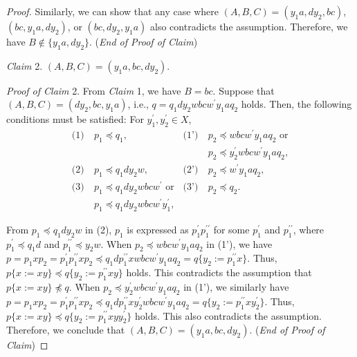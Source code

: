 \begin{proof}
  Similarly, we can show that any case where $(A, B, C) = (y_{1}a, dy_{2}, bc)$, $(bc, y_{1}a, dy_{2})$, or $(bc, dy_{2}, y_{1}a)$ also contradicts the assumption.
  Therefore, we have $B \not\in \{y_{1}a, dy_{2}\}$. (\textit{End of Proof of Claim})

  \smallskip

  \noindent
  \textit{Claim} 2. $(A, B, C) = (y_{1}a, bc, dy_{2})$.

  \smallskip
  \noindent
  \textit{Proof of Claim} 2.
  From \textit{Claim} 1, we have $B=bc$. Suppose that $(A, B, C) = (dy_{2}, bc, y_{1}a)$, i.e., $q = q_{1}dy_{2}wbcw^{\prime}y_{1}aq_{2} $ holds.
  Then, the following conditions must be satisfied: For $y_{1}^{\prime},y_{2}^{\prime}\in X$,
  \begin{align*}
  \textrm{(1)}~& p_{1} \preceq q_{1}, & \textrm{(1')}~& p_{2} \preceq wbcw^{\prime}y_{1}aq_{2}\mbox{ or}\\
  & & & p_{2} \preceq y_{2}^{\prime}wbcw^{\prime}y_{1}aq_{2},\\
  \textrm{(2)}~& p_{1} \preceq q_{1}dy_{2}w, & \textrm{(2')}~& p_{2} \preceq w^{\prime}y_{1}aq_{2}, \\
  \textrm{(3)}~& p_{1} \preceq q_{1}dy_{2}wbcw^{\prime}\mbox{ or} & \textrm{(3')}~& p_{2} \preceq q_{2}.\\
  & p_{1} \preceq q_{1}dy_{2}wbcw^{\prime}y_{1}^{\prime},& &
  \end{align*}
 
  From $p_{1} \preceq q_{1}dy_{2}w$ in (2), $p_{1}$ is expressed as $p^{\prime}_{1}p^{\prime\prime}_{1}$ for some $p^{\prime}_{1}$ and $p^{\prime\prime}_{1}$, where $p^{\prime}_{1} \preceq q_{1}d$ and $p^{\prime\prime}_{1} \preceq y_{2}w$. 
  When $p_{2} \preceq wbcw^{\prime}y_{1}aq_{2}$ in (1'), we have $p=p_{1}xp_{2}=p^{\prime}_{1}p^{\prime\prime}_{1}xp_{2} \preceq q_{1}dp^{\prime\prime}_{1}xwbcw^{\prime}y_{1}aq_{2}=q \{ y_{2}:=p^{\prime\prime}_{1}x \}$.
  Thus, $p \{ x := xy \} \preceq q \{ y_{2}:=p^{\prime\prime}_{1}xy \}$ holds.
  This contradicts the assumption that $p \{ x := xy \} \not \preceq q$.
  When $p_{2} \preceq y_{2}^{\prime}wbcw^{\prime}y_{1}aq_{2}$ in (1'), we similarly have $p=p_{1}xp_{2}=p^{\prime}_{1}p^{\prime\prime}_{1}xp_{2} \preceq q_{1}dp^{\prime\prime}_{1}xy_{2}^{\prime}wbcw^{\prime}y_{1}aq_{2}=q \{ y_{2}:=p^{\prime\prime}_{1}xy_{2}^{\prime} \}$.
  Thus, $p \{ x := xy \} \preceq q \{ y_{2}:=p^{\prime\prime}_{1}xyy_{2}^{\prime} \}$ holds.
  This also contradicts the assumption.
  Therefore, we conclude that $(A, B, C) = (y_{1}a, bc, dy_{2})$.
  (\textit{End of Proof of Claim})


\end{proof}
